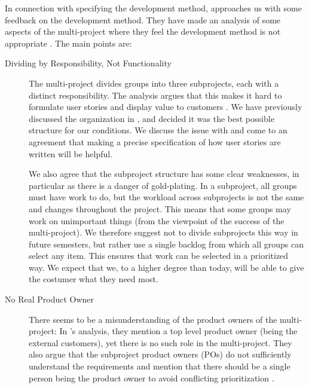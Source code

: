 In connection with specifying the development method,  approaches us with some feedback on the development method. They have made an analysis of some aspects of the multi-project where they feel the development method is not appropriate \cite{processanalysis}. The main points are: 
\begin{description}
  \item[Dividing by Responsibility, Not Functionality] The multi-project divides groups into three subprojects, each with a distinct responsibility. The analysis argues that this makes it hard to formulate user stories and display value to customers \cite{processanalysis}. We have previously discussed the organization in , and decided it was the best possible structure for our conditions. We discuss the issue with  and come to an agreement that making a precise specification of how user stories are written will be helpful. 

We also agree that the subproject structure has some clear weaknesses, in particular as there is a danger of gold-plating. In a subproject, all groups must have work to do, but the workload across subprojects is not the same and changes throughout the project. This means that some groups may work on unimportant things (from the viewpoint of the success of the multi-project). We therefore suggest not to divide subprojects this way in future semesters, but rather use a single backlog from which all groups can select any item. This ensures that work can be selected in a prioritized way. We expect that we, to a higher degree than today, will be able to give the costumer what they need most.

  \item[No Real Product Owner] There seems to be a misunderstanding of the product owners of the multi-project: In 's analysis, they mention a top level product owner (being the external customers), yet there is no such role in the multi-project. They also argue that the subproject product owners (POs) do not sufficiently understand the requirements and mention that there should be a single person being the product owner to avoid conflicting prioritization \cite{processanalysis}.


\end{description}

